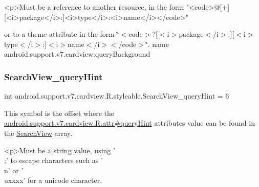 \begin{DoxyVerb}      <p>Must be a reference to another resource, in the form "<code>@[+][<i>package</i>:]<i>type</i>:<i>name</i></code>"
\end{DoxyVerb}
 or to a theme attribute in the form \char`\"{}$<$code$>$?\mbox{[}$<$i$>$package$<$/i$>$\+:\mbox{]}\mbox{[}$<$i$>$type$<$/i$>$\+:\mbox{]}$<$i$>$name$<$/i$>$$<$/code$>$\char`\"{}.  name android.\+support.\+v7.\+cardview\+:query\+Background \mbox{\label{classandroid_1_1support_1_1v7_1_1cardview_1_1R_1_1styleable_a8a00434d6e5e7c5f1d6407571e139641}} 
\subsubsection{\texorpdfstring{Search\+View\+\_\+query\+Hint}{SearchView\_queryHint}}
{\footnotesize\ttfamily int android.\+support.\+v7.\+cardview.\+R.\+styleable.\+Search\+View\+\_\+query\+Hint = 6\hspace{0.3cm}{\ttfamily [static]}}

This symbol is the offset where the \hyperlink{classandroid_1_1support_1_1v7_1_1cardview_1_1R_1_1attr_afe946970f8f7924556844fe1b4970eab}{android.\+support.\+v7.\+cardview.\+R.\+attr\#query\+Hint} attribute\textquotesingle{}s value can be found in the \hyperlink{classandroid_1_1support_1_1v7_1_1cardview_1_1R_1_1styleable_a6a300ecad88f70a7642265f73ff4d33f}{Search\+View} array.

\begin{DoxyVerb}      <p>Must be a string value, using '\\;' to escape characters such as '\\n' or '\\uxxxx' for a unicode character.
\end{DoxyVerb}
 

